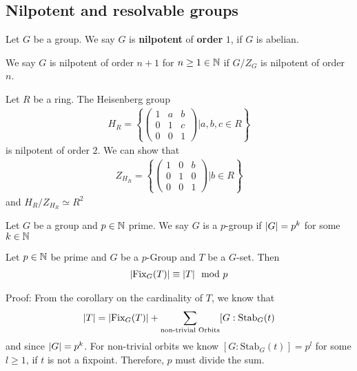 \subsection{Nilpotent and resolvable groups}
\begin{definition}[]
Let $G$ be a group. We say $G$ is \textbf{nilpotent} of  \textbf{order} $1$, if $G$ is abelian.

We say $G$ is nilpotent of order $n+1$ for $n \geq 1 \in \mathbb{N}$ if $G/Z_G$ is nilpotent of order $n$.
\end{definition}


Let $R$ be a ring. The Heisenberg group
\begin{align*}
	H_R = \left\{\begin{pmatrix}
	1 & a & b\\
	0 & 1 & c\\
	0 & 0 & 1
	\end{pmatrix} \big\vert a,b,c \in R\right\}
\end{align*}
is nilpotent of order $2$. We can show that
\begin{align*}
	Z_{H_R} = \left\{\begin{pmatrix}
	1 & 0 & b\\
	0 & 1 & 0\\
	0 & 0 & 1
	\end{pmatrix}\big\vert b \in R\right\}
\end{align*}
and $H_R/Z_{H_R} \simeq R^2$


\begin{definition}[]
Let $G$ be a group and $p \in \mathbb{N}$ prime. We say $G$ is a $p$-group if $\vert G\vert = p^{k}$ for some $k \in \mathbb{N}$
\end{definition}

\begin{lemma}
Let $p \in \mathbb{N}$ be prime and $G$ be a $p$-Group and $T$ be a $G$-set. Then
\begin{align*}
	\vert\text{Fix}_G(T)\vert \equiv \vert T\vert \mod p
\end{align*}
\end{lemma}
Proof: From the corollary on the cardinality of $T$, we know that
\begin{align*}
	\vert T\vert = \vert\text{Fix}_G(T)\vert + \sum_{\text{non-trivial Orbits}} [G: \text{Stab}_G(t)
\end{align*}
and since $\vert G\vert = p^{k}$. For non-trivial orbits we know $[G: \text{Stab}_G(t)] = p^{l}$ for some $l \geq 1$, if $t$ is not a fixpoint. Therefore, $p$ must divide the sum.

